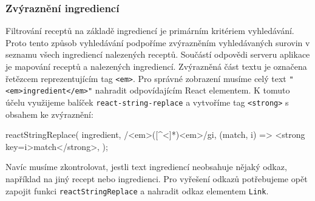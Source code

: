 \subsubsection{Zvýraznění ingrediencí}

Filtrování receptů na základě ingrediencí je primárním kritériem vyhledávání. Proto tento způsob vyhledávání podpoříme zvýrazněním vyhledávaných surovin v seznamu všech ingrediencí nalezených receptů. Součástí odpovědi serveru aplikace je mapování receptů a nalezených ingrediencí. Zvýrazněná část textu je označena řetězcem reprezentujícím tag \texttt{<em>}. Pro správné zobrazení musíme celý text \texttt{"}\texttt{<em>ingredient</em>"} nahradit odpovídajícím React elementem. K tomuto účelu využijeme balíček \texttt{react-string-replace} a vytvoříme tag \texttt{<strong>} s obsahem ke zvýraznění:
\begingroup
\samepage
\begin{code}
reactStringReplace(
  ingredient,
  /<em>([^<]*)<\/em>/gi,
  (match, i) => <strong key={i}>{match}</strong>,
);
\end{code}
\endgroup
Navíc musíme zkontrolovat, jestli text ingrediencí neobsahuje nějaký odkaz, například na jiný recept nebo ingredienci. Pro vyřešení odkazů potřebujeme opět zapojit funkci \texttt{reactStringReplace} a nahradit odkaz elementem \texttt{Link}.

